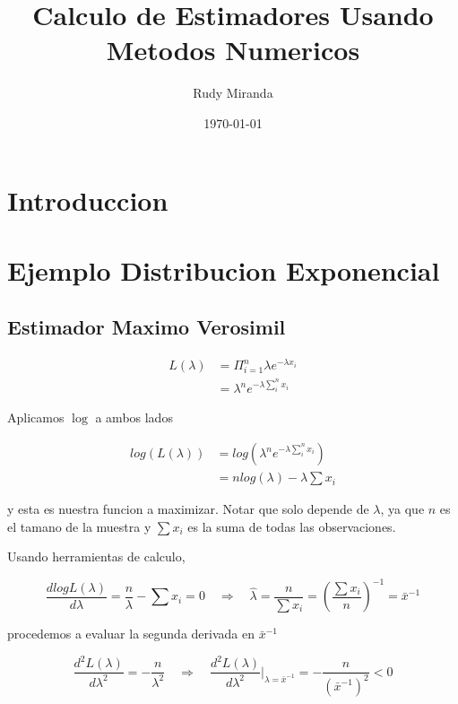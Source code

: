 \documentclass{article}
\title{Calculo de Estimadores Usando Metodos Numericos}
\author{Rudy Miranda}
\date{\today}
\begin{document}
    \maketitle
    
    \section{Introduccion}

    \section{Ejemplo Distribucion Exponencial}

    \subsection{Estimador Maximo Verosimil}
    \begin{align}
        L(\lambda) &= \Pi_{i=1}^{n} \lambda e^{-\lambda x_{i}} \\
                   &= \lambda^{n} e^{-\lambda \sum_{i}^{n} x_{i}}
    \end{align}
    
    Aplicamos $\log$ a ambos lados

    \begin{align}
        log(L(\lambda )) &= log\left(\lambda^{n} e^{-\lambda \sum_{i}^{n} x_{i}}\right) \\
                         &= nlog(\lambda) -\lambda \sum x_{i}
    \end{align}
    
    y esta es nuestra funcion a maximizar. Notar que solo depende de $\lambda$, ya que $n$ es el tamano de la muestra y $\sum x_{i}$ es la suma de todas las observaciones.

    Usando herramientas de calculo,

    \begin{equation}
        \frac{d log L(\lambda)}{d\lambda} = \frac{n}{\lambda} - \sum x_{i} = 0 \quad \Rightarrow \quad \hat{\lambda} = \frac{n}{\sum x_{i}} = \left(\frac{\sum x_{i}}{n} \right )^{-1} = \bar{x}^{-1}
    \end{equation}

    procedemos a evaluar la segunda derivada en $\bar{x}^{-1}$

    \begin{equation}
        \frac{d^{2} L(\lambda)}{d \lambda^{2}} = -\frac{n}{\lambda^{2}} \quad \Rightarrow \quad \frac{d^{2} L(\lambda)}{d \lambda^{2}} \Big|_{\lambda = \bar{x}^{-1}} = -\frac{n}{(\bar{x}^{-1})^{2}} < 0
    \end{equation}
\end{document}
